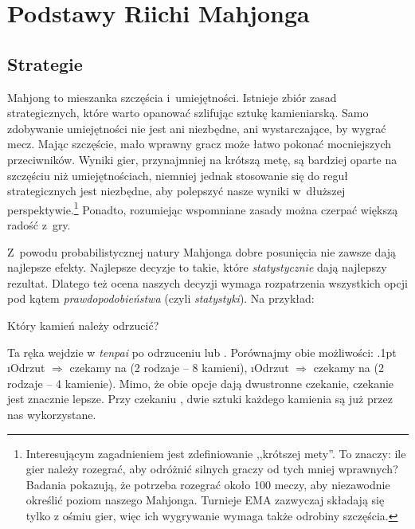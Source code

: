 \chapter{Podstawy Riichi Mahjonga}\label{ch:basic}
\thispagestyle{empty}

\section{Strategie}

Mahjong to mieszanka szczęścia i~umiejętności.
Istnieje zbiór zasad strategicznych, które warto opanować szlifując sztukę kamieniarską.
Samo zdobywanie umiejętności nie jest ani niezbędne, ani wystarczające, by wygrać mecz.
Mając szczęście, mało wprawny gracz może łatwo pokonać mocniejszych przeciwników.
Wyniki gier, przynajmniej na krótszą metę, są bardziej oparte na szczęściu niż umiejętnościach, niemniej jednak stosowanie się do reguł strategicznych jest niezbędne, aby polepszyć nasze wyniki w~dłuższej perspektywie.\footnote{Interesującym zagadnieniem jest zdefiniowanie ,,krótszej mety''. To znaczy: ile gier należy rozegrać, aby odróżnić silnych graczy od tych mniej wprawnych? Badania pokazują, że potrzeba rozegrać około 100 meczy, aby niezawodnie określić poziom naszego Mahjonga. Turnieje EMA zazwyczaj składają się tylko z ośmiu gier, więc ich wygrywanie wymaga także odrobiny szczęścia.}
Ponadto, rozumiejąc wspomniane zasady można czerpać większą radość z~gry.

\bigskip
Z~powodu probabilistycznej natury Mahjonga dobre posunięcia nie zawsze dają najlepsze efekty.
Najlepsze decyzje to takie, które \emph{statystycznie} dają najlepszy rezultat.
Dlatego też ocena naszych decyzji wymaga rozpatrzenia wszystkich opcji pod kątem \emph{prawdopodobieństwa} (czyli \emph{statystyki}).
Na przykład:
\vspace{5pt}
\begin{screen}
\vspace{-10pt}Który kamień należy odrzucić? \vspace{-5pt}
\end{screen}

\pagebreak
\noindent
Ta ręka wejdzie w \emph{tenpai} po odrzuceniu  lub .
Porównajmy obie możliwości:
\bi\itemsep.1pt
\i Odrzut  \hspace{1pt} $\Rightarrow$ czekamy na  (2 rodzaje -- 8 kamieni),
\i Odrzut  \hspace{1pt} $\Rightarrow$ czekamy na  (2 rodzaje -- 4 kamienie).
\ei
Mimo, że obie opcje dają dwustronne czekanie, czekanie  jest znacznie lepsze.
Przy czekaniu , dwie sztuki każdego kamienia są już przez nas wykorzystane.

